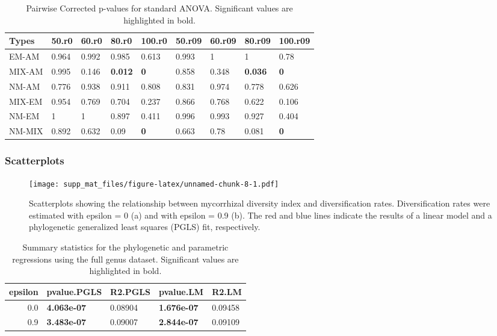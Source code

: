 \documentclass[]{article}
\begin{document}
\begin{table}[H]

\caption{\label{tab:unnamed-chunk-7}Pairwise Corrected p-values for standard ANOVA. Significant values are highlighted in bold.}
\centering
\begin{tabular}{l|l|l|l|l|l|l|l|l}
\hline
Types & 50.r0 & 60.r0 & 80.r0 & 100.r0 & 50.r09 & 60.r09 & 80.r09 & 100.r09\\
\hline
EM-AM & 0.964 & 0.992 & 0.985 & 0.613 & 0.993 & 1 & 1 & 0.78\\
\hline
MIX-AM & 0.995 & 0.146 & \textbf{0.012} & \textbf{0} & 0.858 & 0.348 & \textbf{0.036} & \textbf{0}\\
\hline
NM-AM & 0.776 & 0.938 & 0.911 & 0.808 & 0.831 & 0.974 & 0.778 & 0.626\\
\hline
MIX-EM & 0.954 & 0.769 & 0.704 & 0.237 & 0.866 & 0.768 & 0.622 & 0.106\\
\hline
NM-EM & 1 & 1 & 0.897 & 0.411 & 0.996 & 0.993 & 0.927 & 0.404\\
\hline
NM-MIX & 0.892 & 0.632 & 0.09 & \textbf{0} & 0.663 & 0.78 & 0.081 & \textbf{0}\\
\hline
\end{tabular}
\end{table}

\hypertarget{scatterplots}{%
\subsubsection{Scatterplots}\label{scatterplots}}

\begin{figure}
\centering
\texttt{[image: supp\_mat\_files/figure-latex/unnamed-chunk-8-1.pdf]}
\caption{Scatterplots showing the relationship between mycorrhizal
diversity index and diversification rates. Diversification rates were
estimated with epsilon = 0 (a) and with epsilon = 0.9 (b). The red and
blue lines indicate the results of a linear model and a phylogenetic
generalized least squares (PGLS) fit, respectively.}
\end{figure}

\begin{table}[H]

\caption{\label{tab:unnamed-chunk-9}Summary statistics for the phylogenetic and parametric regressions using the full genus dataset. Significant values are highlighted in bold.}
\centering
\begin{tabular}{r|l|l|l|l}
\hline
epsilon & pvalue.PGLS & R2.PGLS & pvalue.LM & R2.LM\\
\hline
0.0 & \textbf{4.063e-07} & 0.08904 & \textbf{1.676e-07} & 0.09458\\
\hline
0.9 & \textbf{3.483e-07} & 0.09007 & \textbf{2.844e-07} & 0.09109\\
\hline
\end{tabular}
\end{table}
\end{document}
